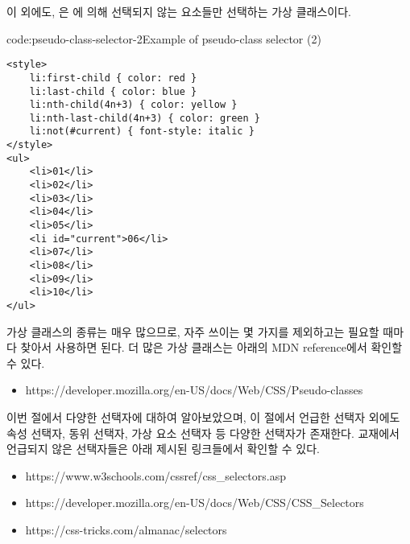 이 외에도, 은 에 의해 선택되지 않는 요소들만 선택하는 가상 클래스이다.

\begin{codeenv}{code:pseudo-class-selector-2}{Example of pseudo-class selector (2)}\begin{verbatim}
<style>
    li:first-child { color: red }
    li:last-child { color: blue }
    li:nth-child(4n+3) { color: yellow }
    li:nth-last-child(4n+3) { color: green }
    li:not(#current) { font-style: italic }
</style>
<ul>
    <li>01</li>
    <li>02</li>
    <li>03</li>
    <li>04</li>
    <li>05</li>
    <li id="current">06</li>
    <li>07</li>
    <li>08</li>
    <li>09</li>
    <li>10</li>
</ul>
\end{verbatim}
\end{codeenv}

가상 클래스의 종류는 매우 많으므로, 자주 쓰이는 몇 가지를 제외하고는 필요할 때마다 찾아서 사용하면 된다. 더 많은 가상 클래스는 아래의 MDN reference에서 확인할 수 있다.

\begin{itemize}
    \item https://developer.mozilla.org/en-US/docs/Web/CSS/Pseudo-classes
\end{itemize}

이번 절에서 다양한 선택자에 대하여 알아보았으며, 이 절에서 언급한 선택자 외에도 속성 선택자, 동위 선택자, 가상 요소 선택자 등 다양한 선택자가 존재한다. 교재에서 언급되지 않은 선택자들은 아래 제시된 링크들에서 확인할 수 있다.

\begin{itemize}
    \item https://www.w3schools.com/cssref/css\_selectors.asp
    \item https://developer.mozilla.org/en-US/docs/Web/CSS/CSS\_Selectors
    \item https://css-tricks.com/almanac/selectors
\end{itemize}
